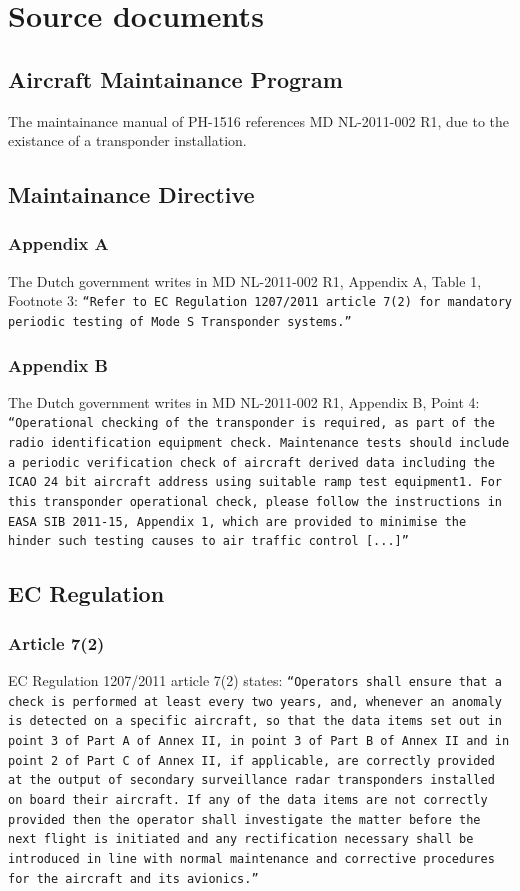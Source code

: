 \documentclass[a4paper]{article}
\begin{document}
\section{Source documents}
\subsection{Aircraft Maintainance Program}
The maintainance manual of PH-1516\cite{AMP_PH1516} references MD NL-2011-002 R1, due to the existance of a transponder installation.

\subsection{Maintainance Directive}
\subsubsection{Appendix A}
The Dutch government writes in MD NL-2011-002 R1\cite{NL_2011_002_R1}, Appendix A, Table 1, Footnote 3: \texttt{``Refer to EC Regulation 1207/2011 article 7(2) for mandatory periodic testing of Mode S Transponder systems.''}
\subsubsection{Appendix B}
The Dutch government writes in MD NL-2011-002 R1\cite{NL_2011_002_R1}, Appendix B, Point 4: \texttt{``Operational checking of the transponder is required, as part of the radio identification equipment check. Maintenance tests should include a periodic verification check of aircraft derived data including the ICAO 24 bit aircraft address using suitable ramp test equipment1. For this transponder operational check, please follow the instructions in EASA SIB 2011-15, Appendix 1, which are provided to minimise the hinder such testing causes to air traffic control [...]''}

\subsection{{EC} Regulation}
\subsubsection{Article 7(2)}
EC Regulation 1207/2011\cite{EC_1207_2011} article 7(2) states: \texttt{``Operators shall ensure that a check is performed at least every two years, and, whenever an anomaly is detected on a specific aircraft, so that the data items set out in point 3 of Part A of Annex II, in point 3 of Part B of Annex II and in point 2 of Part C of Annex II, if applicable, are correctly provided at the output of secondary surveillance radar transponders installed on board their aircraft. If any of the data items are not correctly provided then the operator shall investigate the matter before the next flight is initiated and any rectification necessary shall be introduced in line with normal maintenance and corrective procedures for the aircraft and its avionics.''}
\end{document}

